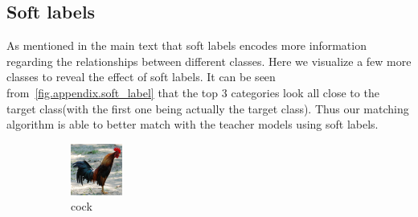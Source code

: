 \documentclass[10pt,twocolumn,letterpaper]{article}
\begin{document}
\subsection{Soft labels}
As mentioned in the main text that soft labels encodes more information regarding the relationships between different classes. Here we visualize a few more classes to reveal the effect of soft labels. It can be seen from~\cref{fig.appendix.soft_label} that the top 3 categories look all close to the target class(with the first one being actually the target class). Thus our matching algorithm is able to better match with the teacher models using soft labels.

\begin{figure}
    \centering
    \begin{subfigure}[t]{0.3\linewidth}\centering
    \includegraphics[width=\textwidth]{images/7.png}
    \caption*{cock}
    \end{subfigure}
    \begin{subfigure}[t]{0.3\linewidth}\centering

\end{subfigure}
\end{figure}
\end{document}
